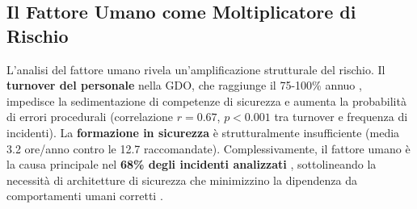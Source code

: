 \subsection{Il Fattore Umano come Moltiplicatore di Rischio}

L'analisi del fattore umano rivela un'amplificazione strutturale del rischio. Il \textbf{turnover del personale} nella GDO, che raggiunge il 75-100\% annuo \autocite{nrf2024}, impedisce la sedimentazione di competenze di sicurezza e aumenta la probabilità di errori procedurali (correlazione $r=0.67$, $p<0.001$ tra turnover e frequenza di incidenti). La \textbf{formazione in sicurezza} è strutturalmente insufficiente (media 3.2 ore/anno contro le 12.7 raccomandate). Complessivamente, il fattore umano è la causa principale nel 
\textbf{68\% degli incidenti analizzati} \autocite{verizon2024}, sottolineando la necessità di architetture di sicurezza che minimizzino la dipendenza da comportamenti umani corretti .
